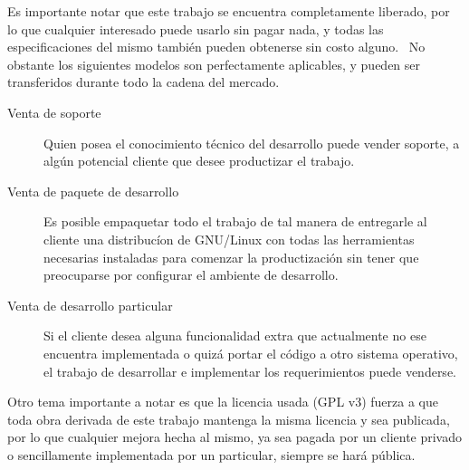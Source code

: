 Es importante notar que este trabajo se encuentra completamente liberado, por
lo que cualquier interesado puede usarlo sin pagar nada, y todas las
especificaciones del mismo tambi\'en pueden obtenerse sin costo alguno. \
No obstante los siguientes modelos son perfectamente aplicables, y pueden ser
transferidos durante todo la cadena del mercado.\\


\begin{description}
 \item[Venta de soporte] Quien posea el conocimiento t\'ecnico del desarrollo
puede vender soporte, a alg\'un potencial cliente que desee productizar el
trabajo. 

 \item[Venta de paquete de desarrollo] Es posible empaquetar todo el trabajo de
tal manera de entregarle al cliente una distribuc\'ion de GNU/Linux con todas
las herramientas necesarias instaladas para comenzar la productizaci\'on sin
tener que preocuparse por configurar el ambiente de desarrollo. 

 \item[Venta de desarrollo particular] Si el cliente desea alguna
funcionalidad extra que actualmente no ese encuentra implementada o quiz\'a
portar el c\'odigo a otro sistema operativo, el trabajo de desarrollar e
implementar los requerimientos puede venderse.
\end{description}

Otro tema importante a notar es que la licencia usada (GPL v3) fuerza a que
toda obra derivada de este trabajo mantenga la misma licencia y sea publicada,
por lo que cualquier mejora hecha al mismo, ya sea pagada por un cliente
privado o sencillamente implementada por un particular, siempre se har\'a
p\'ublica.




